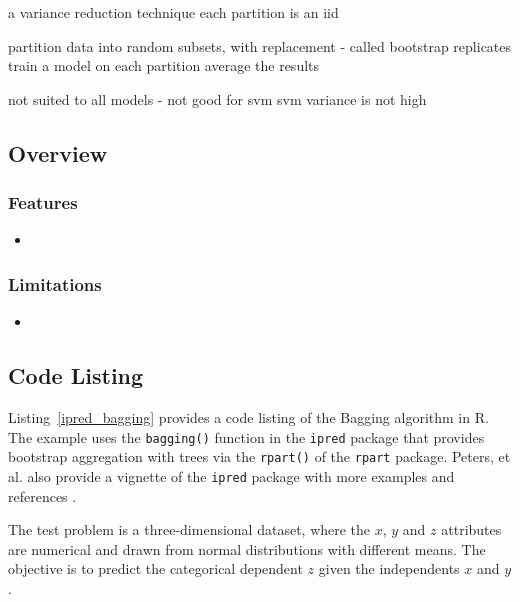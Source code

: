 a variance reduction technique
 each partition is an iid

partition data into random subsets, with replacement - called bootstrap replicates
train a model on each partition
average the results

not suited to all models - not good for svm
svm variance is not high

\subsection{Overview}

\subsubsection{Features}

\begin{itemize}
	\item 
\end{itemize}

\subsubsection{Limitations}

\begin{itemize}
	\item 
\end{itemize}


\subsection{Code Listing}
Listing~\ref{ipred_bagging} provides a code listing of the Bagging algorithm in R.
The example uses the \texttt{bagging()} function in the \texttt{ipred} package \cite{Peters2011} that provides bootstrap aggregation with trees via the \texttt{rpart()} of the \texttt{rpart} package.
Peters, et al. also provide a vignette of the \texttt{ipred} package with more examples and references \cite{Peters2011a}.

The test problem is a three-dimensional dataset, where the $x$, $y$ and $z$ attributes are numerical and drawn from normal distributions with different means. The objective is to predict the categorical dependent $z$ given the independents $x$ and $y$.



